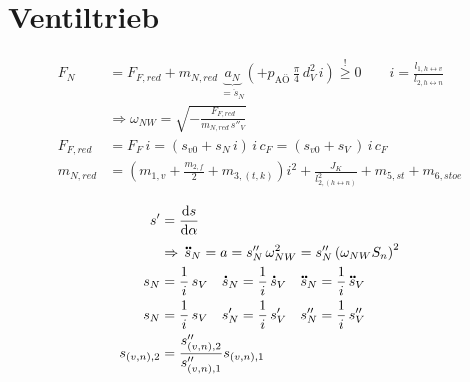 \documentclass[english,threecolumn,color]{latex4ei/latex4ei_sheet}
\begin{document}
\section{Ventiltrieb}
\begin{sectionbox}
	\begin{align*}
		F_N&=F_{F,red}+m_{N,red}\,\underbrace{a_N}_{=\ddot{s}_N} \left( +p_{\text{AÖ}}\,\frac{\pi}{4}\,d_V^2 \,i \right) \overset{!}{\ge} 0 \qquad i=\frac{l_{1,h \leftrightarrow v}}{l_{2,h \leftrightarrow n}}\\
		&\Rightarrow\omega_{NW}=\sqrt{- \frac{F_{F,red}}{m_{N,red}\,s''_V}}\\
		F_{F,red}&=F_F\,i=(s_{v0}+s_N\,i)\,i \, c_F=(s_{v0}+s_V\,)\, i\,c_F\\
		m_{N,red}&= \left( m_{1,v}+\frac{m_{2,f}}{2}+m_{3,(t,k)} \right) i^2
		   +\frac{J_K}{l_{2,(h \leftrightarrow n)}^2}+m_{5,st}+m_{6,stoe}
	\end{align*}

\end{sectionbox}
\begin{sectionbox}
	\begin{align*}
		s'&=\frac{\diff s}{\diff \alpha}\\
		&\Rightarrow\, \ddot{s}_N=a=s_N''\,\omega_{NW}^2=s_N''\left( \omega_{NW} S_n\right)^2\\
		s_N&=\frac{1}{i}\, s_V \quad \dot{s}_N=\frac{1}{i}\,\dot{s}_V \quad \ddot{s}_N=\frac{1}{i}\,\ddot{s}_V\\
		s_N&=\frac{1}{i}\, s_V \quad s'_N=\frac{1}{i}\,s'_V \quad s''_N=\frac{1}{i}\,s''_V\\
		s_{(v,n),2}&=\frac{s''_{(v,n),2}}{s''_{(v,n),1}} s_{(v,n),1}
	\end{align*}
\end{sectionbox}

\end{document}
